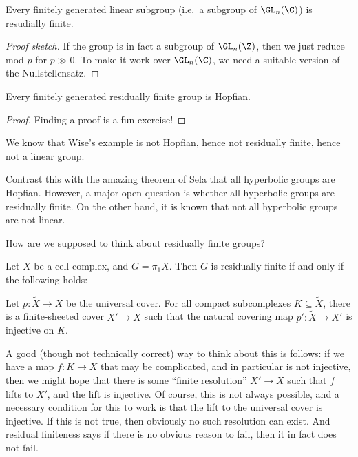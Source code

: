 \documentclass[a4paper]{article}
\begin{document}
\begin{thm}
  Every finitely generated linear subgroup (i.e.\ a subgroup of $\GL_n(\C)$) is resudially finite.
\end{thm}

\begin{proof}[Proof sketch]
  If the group is in fact a subgroup of $\GL_n(\Z)$, then we just reduce mod $p$ for $p \gg 0$. To make it work over $\GL_n(\C)$, we need a suitable version of the Nullstellensatz.
\end{proof}

\begin{thm}
  Every finitely generated residually finite group is Hopfian.
\end{thm}

\begin{proof}
  Finding a proof is a fun exercise!
\end{proof}
We know that Wise's example is not Hopfian, hence not residually finite, hence not a linear group.

Contrast this with the amazing theorem of Sela that all hyperbolic groups are Hopfian. However, a major open question is whether all hyperbolic groups are residually finite. On the other hand, it is known that not all hyperbolic groups are not linear.

How are we supposed to think about residually finite groups?

\begin{lemma}
  Let $X$ be a cell complex, and $G = \pi_1 X$. Then $G$ is residually finite if and only if the following holds:

  Let $p: \tilde{X} \to X$ be the universal cover. For all compact subcomplexes $K \subseteq \tilde{X}$, there is a finite-sheeted cover $X' \to X$ such that the natural covering map $p': \tilde{X} \to X'$ is injective on $K$.
\end{lemma}
A good (though not technically correct) way to think about this is follows: if we have a map $f: K \to X$ that may be complicated, and in particular is not injective, then we might hope that there is some ``finite resolution'' $X' \to X$ such that $f$ lifts to $X'$, and the lift is injective. Of course, this is not always possible, and a necessary condition for this to work is that the lift to the universal cover is injective. If this is not true, then obviously no such resolution can exist. And residual finiteness says if there is no obvious reason to fail, then it in fact does not fail.
\end{document}
